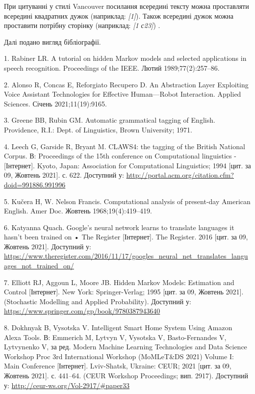 \documentclass[oneside,14pt,a4paper]{extreport}
\begin{document}
При цитуванні у стилі Vancouver посилання всередині тексту можна проставляти всередині квадратних дужок (наприклад: \flqq{}\textit{[1]}\frqq{}). Також всередині дужок можна проставити потрібну сторінку (наприклад: \flqq{}\textit{[1 с23]}\frqq{}) \cite{monash}.

Далі подано вигляд бібліографії.

1.  Rabiner LR. A tutorial on hidden Markov models and selected applications in speech recognition. Proceedings of the IEEE. Лютий 1989;77(2):257–86.

2.  Alonso R, Concas E, Reforgiato Recupero D. An Abstraction Layer Exploiting Voice Assistant Technologies for Effective Human—Robot Interaction. Applied Sciences. Січень 2021;11(19):9165. 

3.  Greene BB, Rubin GM. Automatic grammatical tagging of English. Providence, R.I.: Dept. of Linguistics, Brown University; 1971. 

4.  Leech G, Garside R, Bryant M. CLAWS4: the tagging of the British National Corpus. В: Proceedings of the 15th conference on Computational linguistics - [Інтернет]. Kyoto, Japan: Association for Computational Linguistics; 1994 [цит. за 09, Жовтень 2021]. с. 622. Доступний у: \url{http://portal.acm.org/citation.cfm?doid=991886.991996}

5.  Kučera H, W. Nelson Francis. Computational analysis of present-day American English. Amer Doc. Жовтень 1968;19(4):419–419. 

6.  Katyanna Quach. Google’s neural network learns to translate languages it hasn’t been trained on • The Register [Інтернет]. The Register. 2016 [цит. за 09, Жовтень 2021]. Доступний у: \url{https://www.theregister.com/2016/11/17/googles\_neural\_net\_translates\_languages\_not\_trained\_on/}

7.  Elliott RJ, Aggoun L, Moore JB. Hidden Markov Models: Estimation and Control [Інтернет]. New York: Springer-Verlag; 1995 [цит. за 09, Жовтень 2021]. (Stochastic Modelling and Applied Probability). Доступний у: \url{https://www.springer.com/gp/book/9780387943640}

8.  Dokhnyak B, Vysotska V. Intelligent Smart Home System Using Amazon Alexa Tools. В: Emmerich M, Lytvyn V, Vysotska V, Basto-Fernandes V, Lytvynenko V, за ред. Modern Machine Learning Technologies and Data Science Workshop Proc 3rd International Workshop (MoMLeT\&DS 2021) Volume I: Main Conference [Інтернет]. Lviv-Shatsk, Ukraine: CEUR; 2021 [цит. за 09, Жовтень 2021]. с. 441–64. (CEUR Workshop Proceedings; вип. 2917). Доступний у: \url{http://ceur-ws.org/Vol-2917/#paper33}
\end{document}
